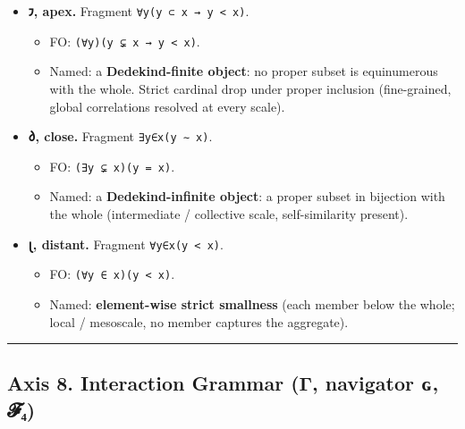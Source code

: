 \begin{itemize}
\tightlist
\item
  \textbf{𐑲, apex.} Fragment
  \texttt{∀y(y\ ⊂\ x\ →\ \textbar{}y\textbar{}\ \textless{}\ \textbar{}x\textbar{})}.

  \begin{itemize}
  \tightlist
  \item
    FO:
    \texttt{(∀y)(y\ ⊊\ x\ →\ \textbar{}y\textbar{}\ \textless{}\ \textbar{}x\textbar{})}.
  \item
    Named: a \textbf{Dedekind-finite object}: no proper subset is
    equinumerous with the whole. Strict cardinal drop under proper
    inclusion (fine-grained, global correlations resolved at every
    scale).
  \end{itemize}
\item
  \textbf{𐑔, close.} Fragment
  \texttt{∃y∈x(\textbar{}y\textbar{}\ ∼\ \textbar{}x\textbar{})}.

  \begin{itemize}
  \tightlist
  \item
    FO:
    \texttt{(∃y\ ⊊\ x)(\textbar{}y\textbar{}\ =\ \textbar{}x\textbar{})}.
  \item
    Named: a \textbf{Dedekind-infinite object}: a proper subset in
    bijection with the whole (intermediate / collective scale,
    self-similarity present).
  \end{itemize}
\item
  \textbf{𐑚, distant.} Fragment
  \texttt{∀y∈x(\textbar{}y\textbar{}\ \textless{}\ \textbar{}x\textbar{})}.

  \begin{itemize}
  \tightlist
  \item
    FO:
    \texttt{(∀y\ ∈\ x)(\textbar{}y\textbar{}\ \textless{}\ \textbar{}x\textbar{})}.
  \item
    Named: \textbf{element-wise strict smallness} (each member below the
    whole; local / mesoscale, no member captures the aggregate).
  \end{itemize}
\end{itemize}

\begin{center}\rule{0.5\linewidth}{0.5pt}\end{center}

\hypertarget{axis-8.-interaction-grammar-ux3b3-navigator-ux262-ux1d4d5ux2084}{%
\subsection{Axis 8. Interaction Grammar (Γ, navigator ɢ,
𝓕₄)}\label{axis-8.-interaction-grammar-ux3b3-navigator-ux262-ux1d4d5ux2084}}

